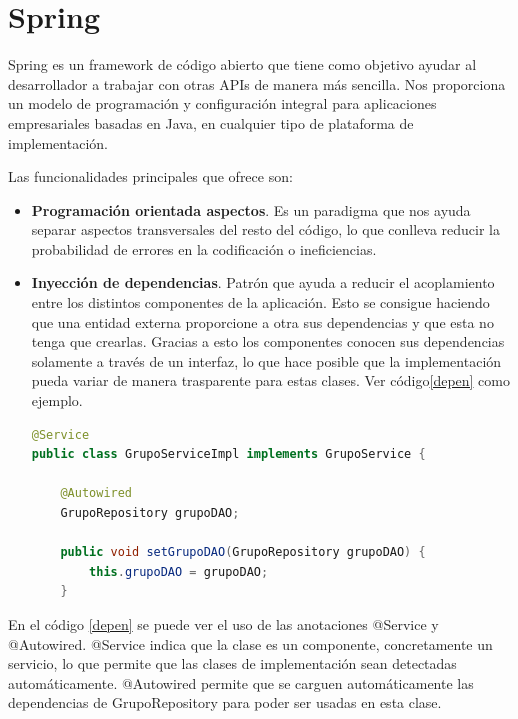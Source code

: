 	
	
\section{Spring}
Spring es un framework \cite{5} de código abierto que tiene como objetivo ayudar al desarrollador a trabajar con otras APIs de manera más sencilla. Nos proporciona un modelo de programación y configuración integral para aplicaciones empresariales basadas en Java, en cualquier tipo de plataforma de implementación. 
	
Las funcionalidades principales que ofrece son:

\begin{itemize}
\item \textbf{Programación orientada aspectos}. Es un paradigma que nos ayuda separar aspectos transversales del resto del código, lo que conlleva reducir  la probabilidad de errores en la codificación o ineficiencias.


\item\textbf{ Inyección de dependencias}. Patrón que ayuda a reducir el acoplamiento entre los distintos componentes de la aplicación. Esto se consigue haciendo que una entidad externa proporcione a otra sus dependencias y que esta no tenga que crearlas.
Gracias a esto los componentes conocen sus dependencias solamente a través de un interfaz, lo que hace posible que la implementación pueda variar de manera trasparente para estas clases. Ver código\ref{depen} como ejemplo.




 \begin{lstlisting}[language=java,caption={Inyección de dependencias},label=depen]
@Service
public class GrupoServiceImpl implements GrupoService {

	@Autowired
	GrupoRepository grupoDAO;

	public void setGrupoDAO(GrupoRepository grupoDAO) {
		this.grupoDAO = grupoDAO;
	}


\end{lstlisting} 



\end{itemize}

En el código \ref{depen} se puede ver el uso de las anotaciones @Service y @Autowired. @Service indica que la clase es un componente, concretamente un servicio, lo que permite que las clases de implementación sean detectadas automáticamente. @Autowired  permite que se carguen automáticamente las dependencias de GrupoRepository para poder ser usadas en esta clase.
